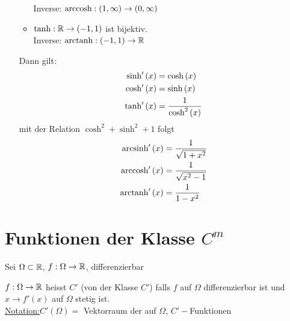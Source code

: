 \begin{enumerate}
\begin{itemize}
Inverse: $\operatorname{arccosh}:\left( 1,\infty\right)\to\left( 0,\infty\right)$
\item $\tanh :\mathbb{R} \to \left( {-1,1 } \right)$ ist bijektiv.\\
Inverse: $\operatorname{arctanh}:\left( -1,1\right)\to\mathbb{R}$
\end{itemize}
Dann gilt:
\begin{align*}
{\mathop{\rm sinh'}\nolimits} \left( x \right) &= \cosh \left( x \right)\\
{\mathop{\rm cosh'}\nolimits} \left( x \right) &= \sinh \left( x \right)\\
{\mathop{\rm tanh'}\nolimits} \left( x \right) &= \frac{1}{{{{\cosh }^2}\left( x \right)}}
\end{align*}
mit der Relation $\cosh^2+\sinh^2+1$ folgt
\begin{align*}
\operatorname{arcsinh}'\left( x \right) &= \frac{1}{{\sqrt {1 + {x^2}} }}\\
\operatorname{arccosh}'\left( x \right) &= \frac{1}{{\sqrt {{x^2} - 1} }}\\
\operatorname{arctanh}'\left( x \right) &= \frac{1}{{1 - {x^2}}}
\end{align*}
\end{enumerate}

\section{Funktionen der Klasse $C^m$}
Sei $\Omega\subset\mathbb{R}$, $f:\Omega\to\mathbb{R}$, differenzierbar
\begin{definition}{5.23}
$f:\Omega\to\mathbb{R}$ heisst $C'$ (von der Klasse $C'$) falls $f$ auf $\Omega$ differenzierbar ist und $x\to f'(x)$ auf $\Omega$ stetig ist.\\

\noindent\underline{Notation:}$C'\left( \Omega\right)=$ Vektorraum der auf $\Omega$, $C'-$Funktionen
\end{definition}

